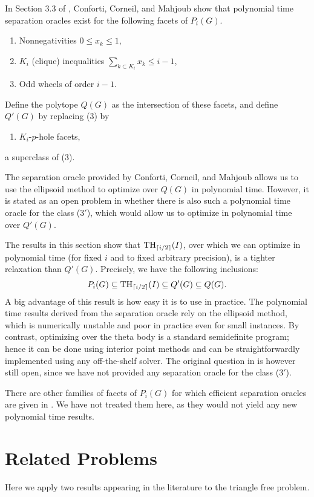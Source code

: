 In Section 3.3 of \cite{conforti}, Conforti, Corneil, and Mahjoub show that polynomial time separation oracles exist for the following facets of $P_i(G)$.
\begin{enumerate}
\item Nonnegativities $0 \le x_k \le 1$,
\item $K_i$ (clique) inequalities $\sum_{k \subset K_i}x_k \le i-1$,
\item Odd wheels of order $i-1$.
\end{enumerate}
Define the polytope $Q(G)$ as the intersection of these facets, and define $Q'(G)$ by replacing (3) by 
\begin{enumerate}[label=(\arabic*$'$),ref=(\arabic*$'$),start=3]
\item $K_i$-$p$-hole facets,
\end{enumerate}
a superclass of (3).

The separation oracle provided by Conforti, Corneil, and Mahjoub \cite{conforti} allows us to use the ellipsoid method to optimize over $Q(G)$ in polynomial time. However, it is stated as an open problem in \cite{conforti} whether there is also such a polynomial time oracle for the class ($3'$), which would allow us to optimize in polynomial time over $Q'(G)$.

The results in this section show that $\textup{TH}_{\lceil i/2 \rceil}(I)$, over which we can optimize in polynomial time (for
fixed $i$ and to fixed arbitrary precision), is a tighter relaxation than $Q'(G)$. Precisely, we have the following inclusions:
$$P_{i}(G) \subseteq  \textup{TH}_{\lceil i/2 \rceil}(I) \subseteq Q'(G) \subseteq Q(G).$$
A big advantage of this result is how easy it is to use in practice. The polynomial time results derived from the separation oracle rely on the ellipsoid method, which is numerically unstable and poor in practice even for small instances. By contrast, optimizing over the theta body is a standard semidefinite program; hence it can be done using interior point methods and can be straightforwardly implemented using any off-the-shelf solver. The original question in \cite{conforti} is however still open, since we have not provided any separation oracle for the class ($3'$).

There are other families of facets of $P_i(G)$ for which efficient separation oracles are given in \cite{conforti}. We have not treated them here, as they would not yield any new polynomial time results.

\section{Related Problems}
Here we apply two results appearing in the literature to the triangle free problem.

